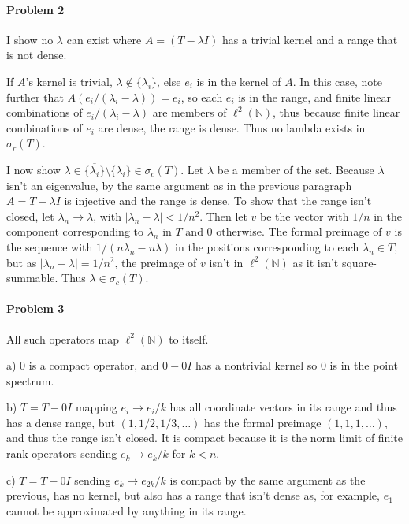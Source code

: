 \documentclass[12pt]{article}
\renewcommand{\l}{\lambda}
\begin{document}
\paragraph{Problem 2}
I show no $\l$ can exist where $A = (T-\l I)$ has a trivial kernel and a
range that is not dense.

If $A$'s kernel is trivial, $\l \notin \{\l_i\}$, else $e_i$ is in the kernel of
$A$. In this case, note further that $A(e_i/(\l_i-\l)) = e_i$, so each $e_i$ is
in the range, and finite linear combinations of $e_i/(\l_i-\l)$ are members of
$\ell^2(\mathbb{N})$, thus because finite linear combinations of $e_i$ are dense,
the range is dense. Thus no lambda exists in $\sigma_r(T)$.

I now show $\lambda \in \overline{\{\l_i\}} \setminus \{\l_i\} \in \sigma_c(T)$.
Let $\l$ be a member of the set. Because $\l$ isn't an eigenvalue, by the same
argument as in the previous paragraph $A = T-\l I$ is injective and the range
is dense. To show that the range isn't closed, let $\l_n\to \l$, with $|\l_n-\l|
< 1/n^2$. Then let $v$ be the vector with $1/n$ in the component corresponding
to $\l_n$ in $T$ and 0 otherwise. The formal preimage of $v$ is the sequence with
$1/(n\l_n-n\l)$ in the positions corresponding to each $\l_n \in T$, but as
$|\l_n-\l| = 1/n^2$, the preimage of $v$ isn't in $\ell^2(\mathbb{N})$ as it
isn't square-summable. Thus $\l \in \sigma_c(T)$.

\paragraph{Problem 3}
All such operators map $\ell^2(\mathbb{N})$ to itself.

a) 0 is a compact operator, and $0 - 0I$ has a nontrivial kernel so 0 is in the
point spectrum.

b) $T = T - 0I$ 
 mapping $e_i \to e_i/k$ has all coordinate vectors in its
range and thus has a dense range, but $(1,1/2,1/3,\ldots)$ has the formal
preimage $(1,1,1,\ldots)$, and thus the range isn't closed. It is compact
because it is the norm limit of finite rank operators sending $e_k\to e_k/k$
for $k < n$.

c) $T = T- 0I$ sending $e_k \to e_{2k}/k$ is compact by the same
argument as the previous, has no kernel, but also has a range that isn't dense
as, for example, $e_1$ cannot be approximated by anything in its range.
\end{document}
